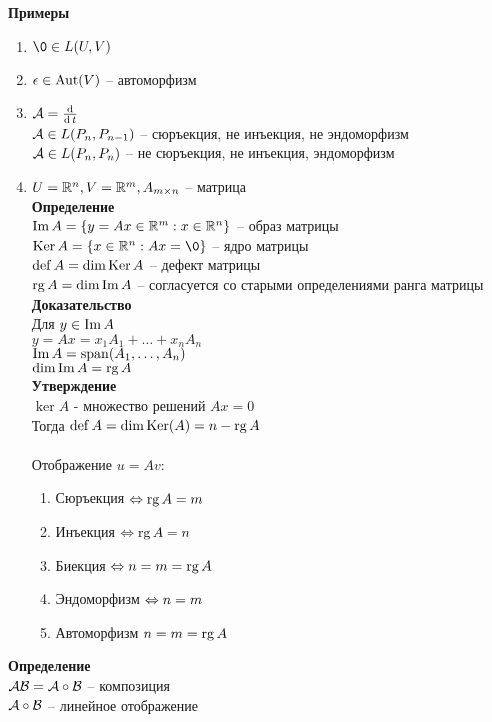 \documentclass[12pt]{article}
\begin{document}
\textbf{Примеры}
\begin{enumerate}
    \item $\0 \in L(U, V)$
    \item $\epsilon \in \operatorname{Aut}(V)$ -- автоморфизм
    \item $\mathcal{A}=\frac{\operatorname{d}}{\operatorname{d} t}$\\
    $\mathcal{A} \in L(P_n, P_{n-1})$ -- сюръекция, не инъекция, не эндоморфизм\\
    $\mathcal{A} \in L(P_n, P_n)$ -- не сюръекция, не инъекция, эндоморфизм
    \item $U=\mathbb{R}^n, V=\mathbb{R}^m, A_{m \times n}$ -- матрица\\
    \textbf{Определение}\\
    $\operatorname{Im} A = \{ y = Ax \in \mathbb{R}^m: x \in \mathbb{R}^n \}$ -- образ матрицы\\
    $\ker A = \{ x \in \Rset^n: Ax = \0 \}$ -- ядро матрицы\\
    $\operatorname{def} A = \dim \operatorname{Ker} A$ -- дефект матрицы\\
    $\operatorname{rg} A = \dim \operatorname{Im} A$ -- согласуется со старыми определениями ранга матрицы\\
    \textbf{Доказательство}\\
    Для $y \in \operatorname{Im} A$\\
    $y = Ax = x_1 A_1 + \ldots + x_n A_n$\\
    $\operatorname{Im} A = \operatorname{span}(A_1, \ldots, A_n)$\\
    $\dim \operatorname{Im} A = \operatorname{rg} A$\\
    \textbf{Утверждение}\\
    $\ker A$ - множество решений $Ax = 0$\\
    Тогда $\operatorname{def} A = \dim \operatorname{Ker}(A) = n - \operatorname{rg} A $\\\\
    Отображение $u = Av$:
    \begin{enumerate}
        \item Сюръекция $\Leftrightarrow \operatorname{rg} A = m$
        \item Инъекция $\Leftrightarrow \operatorname{rg} A = n$
        \item Биекция $\Leftrightarrow n = m = \operatorname{rg} A$
        \item Эндоморфизм $\Leftrightarrow n = m$
        \item Автоморфизм $n = m = \operatorname{rg} A$
    \end{enumerate}
\end{enumerate}
\textbf{Определение}\\
$\mathcal{A}\mathcal{B} = \mathcal{A} \circ \mathcal{B}$ -- композиция\\
$\mathcal{A} \circ \mathcal{B}$ -- линейное отображение\\
\end{document}
